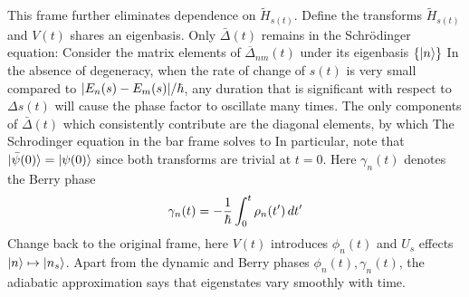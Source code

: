 This frame further eliminates dependence on $\tilde H_{s(t)}$. Define the transforms 
$\tilde H_{s(t)}$ and $V(t)$ shares an eigenbasis.  
Only $\bar \Delta(t)$ remains in the Schrödinger equation: 
Consider the matrix elements of $\overline \Delta_{nm}(t)$ under its eigenbasis $\{|n\rangle\}$
In the absence of degeneracy, when the rate of change of $s(t)$ is very small compared 
to $|E_n(s) - E_m(s)|/\hbar$, any duration that is significant with respect to $\Delta s(t)$ 
will cause the phase factor to oscillate many times. The only components of $\bar \Delta(t)$ 
which consistently contribute are the diagonal elements, by which 
The Schrodinger equation in the bar frame solves to 
In particular, note that $|\bar \psi(0)\rangle = |\psi(0)\rangle$ since both transforms 
are trivial at $t=0$. Here $\gamma_n(t)$ denotes the Berry phase 
\[ 
    \gamma_n(t) = -\dfrac 1 {\hbar} \int_0^t \rho_n(t')\, dt'
\] 
Change back to the original frame, here $V(t)$ introduces $\phi_n(t)$ and 
$U_s$ effects $|n\rangle \mapsto |n_s\rangle$. 
Apart from the dynamic and Berry phases $\phi_n(t), \gamma_n(t)$, the adiabatic 
approximation says that eigenstates vary smoothly with time. 